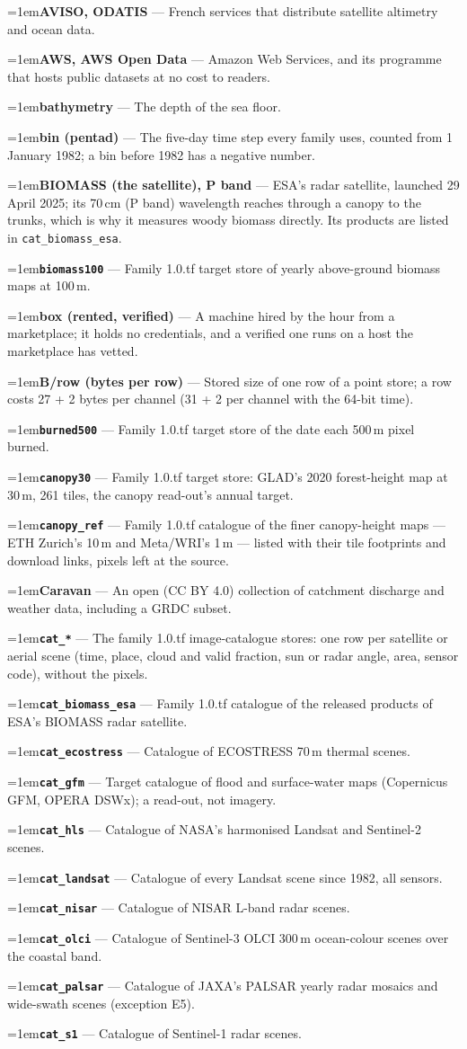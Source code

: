 \documentclass[10pt]{article}
\newcommand{\code}[1]{\texttt{#1}}
\newcommand{\gl}[2]{\par\hangindent=1em\hangafter=1\textbf{#1} --- #2\par}
\begin{document}
\gl{AVISO, ODATIS}{French services that distribute satellite altimetry and ocean data.}
\gl{AWS, AWS Open Data}{Amazon Web Services, and its programme that hosts public datasets at no cost to readers.}
\gl{bathymetry}{The depth of the sea floor.}
\gl{bin (pentad)}{The five-day time step every family uses, counted from 1 January 1982; a bin before 1982 has a negative number.}
\gl{BIOMASS (the satellite), P band}{ESA's radar satellite, launched 29 April 2025; its 70\,cm (P band) wavelength reaches through a canopy to the trunks, which is why it measures woody biomass directly. Its products are listed in \code{cat\_biomass\_esa}.}
\gl{\code{biomass100}}{Family 1.0.tf target store of yearly above-ground biomass maps at 100\,m.}
\gl{box (rented, verified)}{A machine hired by the hour from a marketplace; it holds no credentials, and a verified one runs on a host the marketplace has vetted.}
\gl{B/row (bytes per row)}{Stored size of one row of a point store; a row costs 27 + 2 bytes per channel (31 + 2 per channel with the 64-bit time).}
\gl{\code{burned500}}{Family 1.0.tf target store of the date each 500\,m pixel burned.}
\gl{\code{canopy30}}{Family 1.0.tf target store: GLAD's 2020 forest-height map at 30\,m, 261 tiles, the canopy read-out's annual target.}
\gl{\code{canopy\_ref}}{Family 1.0.tf catalogue of the finer canopy-height maps --- ETH Zurich's 10\,m and Meta/WRI's 1\,m --- listed with their tile footprints and download links, pixels left at the source.}
\gl{Caravan}{An open (CC BY 4.0) collection of catchment discharge and weather data, including a GRDC subset.}
\gl{\code{cat\_*}}{The family 1.0.tf image-catalogue stores: one row per satellite or aerial scene (time, place, cloud and valid fraction, sun or radar angle, area, sensor code), without the pixels.}
\gl{\code{cat\_biomass\_esa}}{Family 1.0.tf catalogue of the released products of ESA's BIOMASS radar satellite.}
\gl{\code{cat\_ecostress}}{Catalogue of ECOSTRESS 70\,m thermal scenes.}
\gl{\code{cat\_gfm}}{Target catalogue of flood and surface-water maps (Copernicus GFM, OPERA DSWx); a read-out, not imagery.}
\gl{\code{cat\_hls}}{Catalogue of NASA's harmonised Landsat and Sentinel-2 scenes.}
\gl{\code{cat\_landsat}}{Catalogue of every Landsat scene since 1982, all sensors.}
\gl{\code{cat\_nisar}}{Catalogue of NISAR L-band radar scenes.}
\gl{\code{cat\_olci}}{Catalogue of Sentinel-3 OLCI 300\,m ocean-colour scenes over the coastal band.}
\gl{\code{cat\_palsar}}{Catalogue of JAXA's PALSAR yearly radar mosaics and wide-swath scenes (exception E5).}
\gl{\code{cat\_s1}}{Catalogue of Sentinel-1 radar scenes.}
\end{document}

